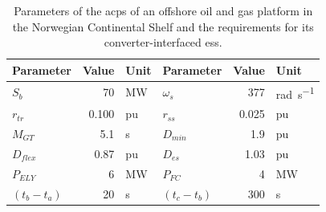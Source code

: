 \documentclass[utf8]{frontiersSCNS} %
\begin{document}
\begin{table}[htbp!]
\caption{Parameters of the \gls{acps} of an offshore oil and gas platform in the Norwegian Continental Shelf and the requirements for its converter-interfaced \gls{ess}.}
\centering
\begin{tabular}{lrl|lrl}
    \toprule
    \textbf{Parameter}	& \textbf{Value} & \textbf{Unit} & \textbf{Parameter}	& \textbf{Value} & \textbf{Unit} \\
    \midrule
	$ S_b $ & 70 & \si{\mega\watt} & $ \omega_s $ & 377 & \si{\radian\per\second} \\
	$ r_{tr} $ & 0.100 & pu & $ r_{ss} $ & 0.025 & pu \\
	$ M_{GT} $ & 5.1 & \si{\second} & $ D_{min} $ & 1.9 & pu \\
	$ D_{flex} $ & 0.87 & pu & $ D_{es} $ & 1.03 & pu \\
	$ P_{ELY} $ & 6 & \si{\mega\watt} & $ P_{FC} $ & 4 & \si{\mega\watt} \\ 
	$(t_b - t_a)$ & 20 & \si{\second} & $(t_c - t_b)$ & 300 & \si{\second}\\
\end{tabular}
\label{tab:par-case-study}
\end{table}
\end{document}
